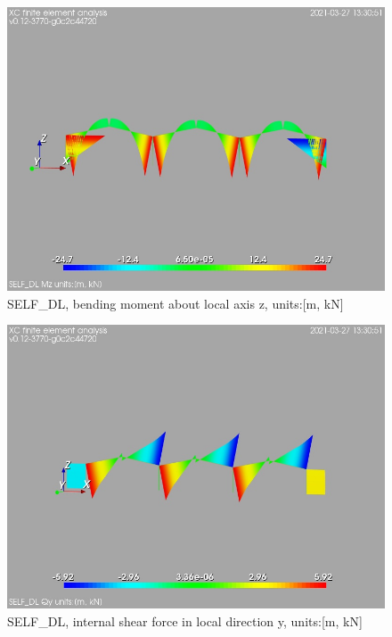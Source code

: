 \begin{figure}
\begin{center}
\includegraphics[width=\linewidth]{calc_results/sole_zeinali/text/graphics/resSimplLC/SELF_DLallMemberSetMz}
\caption{SELF_DL, bending moment about local axis z, units:[m, kN]}
\end{center}
\end{figure}
\begin{figure}
\begin{center}
\includegraphics[width=\linewidth]{calc_results/sole_zeinali/text/graphics/resSimplLC/SELF_DLallMemberSetQy}
\caption{SELF_DL, internal shear force in local direction y, units:[m, kN]}
\end{center}
\end{figure}
